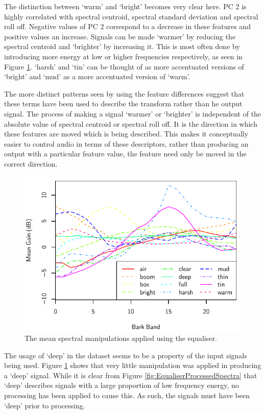 			The distinction between `warm' and `bright' becomes very clear here. PC 2 is highly correlated with
			spectral centroid, spectral standard deviation and spectral roll off. Negative values of PC 2
			correspond to a decrease in these features and positive values an increase. Signals can be made
			`warmer' by reducing the spectral centroid and `brighter' by increasing it. This is most often done
			by introducing more energy at low or higher frequencies respectively, as seen in Figure
			\ref{fig:EqualiserDifferenceSpectra}. `harsh' and `tin' can be thought of as more accentuated
			versions of `bright' and `mud' as a more accentuated version of `warm'.

			The more distinct patterns seen by using the feature differences suggest that these terms have been
			used to describe the transform rather than he output signal. The process of making a signal
			`warmer' or `brighter' is independent of the absolute value of spectral centroid or spectral roll
			off. It is the direction in which these features are moved which is being described. This makes it
			conceptually easier to control audio in terms of these descriptors, rather than producing an output
			with a particular feature value, the feature need only be moved in the correct direction.

			\begin{figure}[h!]
				\centering
				\includegraphics{chapter4/Images/EqualiserDifferenceSpectra.pdf}
				\caption{The mean spectral manipulations applied using the equaliser.}
				\label{fig:EqualiserDifferenceSpectra}
			\end{figure}

			The usage of `deep' in the dataset seems to be a property of the input signals being used. Figure
			\ref{fig:EqualiserDifferenceSpectra} shows that very little manipulation was applied in producing a
			`deep' signal. While it is clear from Figure \ref{fig:EqualiserProcessedSpectra} that `deep'
			describes signals with a large proportion of low frequency energy, no processing has been applied
			to cause this. As such, the signals must have been `deep' prior to processing.

